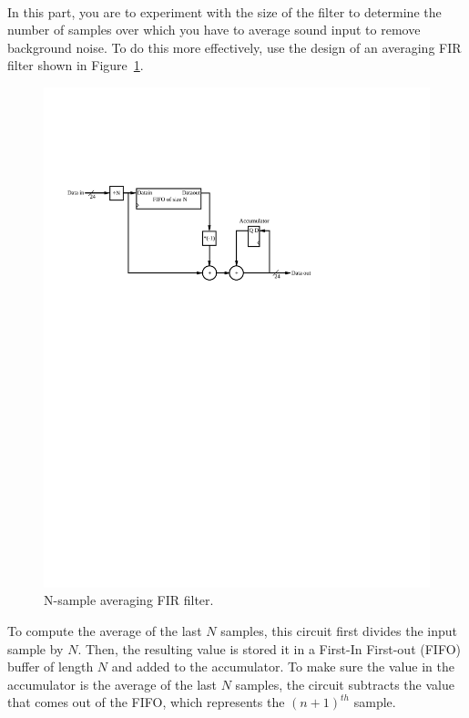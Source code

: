 \documentclass[epsfig,10pt,fullpage]{article}
\begin{document}
~\\
In this part, you are to experiment with the size of the filter to determine the number of samples over which you have to average sound input to remove
background noise. To do this more effectively, use the design of an averaging FIR filter shown in Figure~\ref{fig:scalable_averaging_fir}.

\begin{figure}[H]
\centering
\includegraphics{figures/n_tap_averaging_fir_filter.pdf}
\caption{N-sample averaging FIR filter.}
\label{fig:scalable_averaging_fir}
\end{figure}

To compute the average of the last $N$ samples, this circuit first divides the input sample by $N$. Then, the resulting value
is stored it in a First-In First-out (FIFO) buffer of length $N$ and added to the accumulator. To make sure the value
in the accumulator is the average of the last $N$ samples, the circuit subtracts the value that comes out of the FIFO,
which represents the $(n+1)^{th}$ sample.
\end{document}
